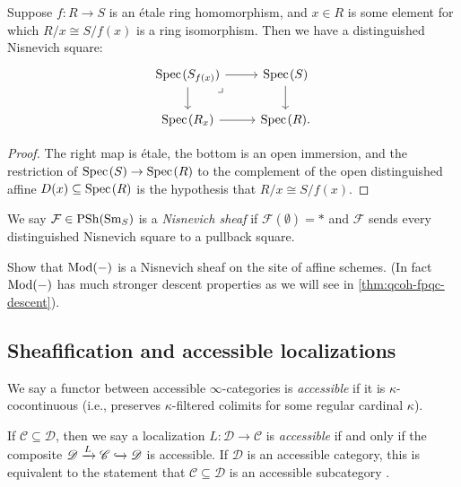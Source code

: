 \documentclass[11pt,openany]{book}
\renewcommand{\Pre}{\mathrm{PSh}}
\begin{document}
\begin{example}
\label{ex:affine-distinguished-nisnevich-square}
Suppose $f: R \to S$ is an \'etale ring homomorphism, and $x\in R$ is some element for which $R/x \cong S/f(x)$ is a ring isomorphism. Then we have a distinguished Nisnevich square:
\[ \begin{tikzcd}
    \Spec(S_{f(x)})\rar\dar\pb & \Spec(S)\dar\\
    \Spec(R_x)\rar & \Spec(R).
\end{tikzcd} \]
\end{example}
\begin{proof} The right map is \'etale, the bottom is an open immersion, and the restriction of $\text{Spec}\hspace{0.1em}(S) \to \text{Spec}\hspace{0.1em}(R)$ to the complement of the open distinguished affine $D(x) \subseteq \text{Spec}\hspace{0.1em}(R)$ is the hypothesis that $R/x \cong S/f(x)$.
\end{proof}

\begin{definition} We say $\mathcal{F} \in \Pre(\Sm_S)$ is a \textit{Nisnevich sheaf} if $\mathcal{F}(\emptyset)= \ast$ and $\mathcal{F}$ sends every distinguished Nisnevich square to a pullback square.
\end{definition}

\begin{exercise} Show that $\mathrm{Mod}(-)$ is a Nisnevich sheaf on the site of affine schemes. (In fact $\mathrm{Mod}(-)$ has much stronger descent properties as we will see in \autoref{thm:qcoh-fpqc-descent}).
\end{exercise}



\subsection{Sheafification and accessible localizations}

\begin{definition} \cite[5.4.2.5]{HTT} We say a functor between accessible $\infty$-categories is \textit{accessible} if it is $\kappa$-cocontinuous (i.e., preserves $\kappa$-filtered colimits for some regular cardinal $\kappa$).
\end{definition}

\begin{definition} If $\mathscr{C} \subseteq \mathscr{D}$, then we say a localization $L \colon \mathscr{D} \to \mathscr{C}$ is \textit{accessible} if and only if the composite $\mathscr{D} \xrightarrow{L} \mathscr{C} \xhookrightarrow{} \mathscr{D}$ is accessible. If $\mathscr{D}$ is an accessible category, this is equivalent to the statement that $\mathscr{C} \subseteq \mathscr{D}$ is an accessible subcategory \cite[5.5.4.2]{HTT}.
\end{definition}
\end{document}
